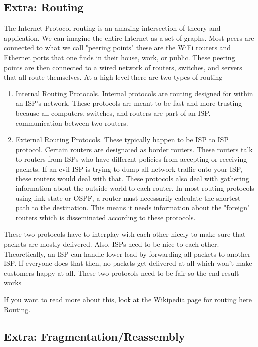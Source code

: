 \subsection{Extra: Routing}

The Internet Protocol routing is an amazing intersection of theory and application.
We can imagine the entire Internet as a set of graphs.
Most peers are connected to what we call "peering points" these are the WiFi routers and Ethernet ports that one finds in their house, work, or public.
These peering points are then connected to a wired network of routers, switches, and servers that all route themselves.
At a high-level there are two types of routing

\begin{enumerate}
\item Internal Routing Protocols.
  Internal protocols are routing designed for within an ISP's network.
  These protocols are meant to be fast and more trusting because all computers, switches, and routers are part of an ISP.
  communication between two routers.
\item External Routing Protocols.
  These typically happen to be ISP to ISP protocol.
  Certain routers are designated as border routers.
  These routers talk to routers from ISPs who have different policies from accepting or receiving packets.
  If an evil ISP is trying to dump all network traffic onto your ISP, these routers would deal with that.
  These protocols also deal with gathering information about the outside world to each router.
  In most routing protocols using link state or OSPF, a router must necessarily calculate the shortest path to the destination.
  This means it needs information about the "foreign" routers which is disseminated according to these protocols.
\end{enumerate}

These two protocols have to interplay with each other nicely to make sure that packets are mostly delivered.
Also, ISPs need to be nice to each other.
Theoretically, an ISP can handle lower load by forwarding all packets to another ISP.
If everyone does that then, no packets get delivered at all which won't make customers happy at all.
These two protocols need to be fair so the end result works

If you want to read more about this, look at the Wikipedia page for routing here \href{https://en.wikipedia.org/wiki/Routing}{Routing}.

\subsection{Extra: Fragmentation/Reassembly}

